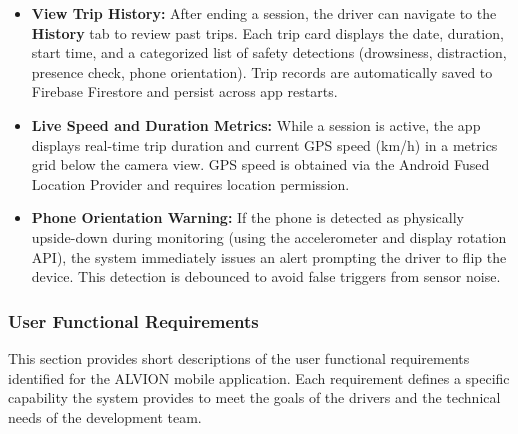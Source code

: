 \documentclass[11pt]{report}
\begin{document}
\begin{itemize}
    \item \textbf{View Trip History:}
    After ending a session, the driver can navigate to the \textbf{History} tab to review past trips. Each trip card displays the date, duration, start time, and a categorized list of safety detections (drowsiness, distraction, presence check, phone orientation). Trip records are automatically saved to Firebase Firestore and persist across app restarts.

    \item \textbf{Live Speed and Duration Metrics:}
    While a session is active, the app displays real-time trip duration and current GPS speed (km/h) in a metrics grid below the camera view. GPS speed is obtained via the Android Fused Location Provider and requires location permission.

    \item \textbf{Phone Orientation Warning:}
    If the phone is detected as physically upside-down during monitoring (using the accelerometer and display rotation API), the system immediately issues an alert prompting the driver to flip the device. This detection is debounced to avoid false triggers from sensor noise.

\end{itemize}

\subsubsection{User Functional Requirements}
This section provides short descriptions of the user functional requirements identified for the ALVION mobile application. Each requirement defines a specific capability the system provides to meet the goals of the drivers and the technical needs of the development team.
\end{document}

